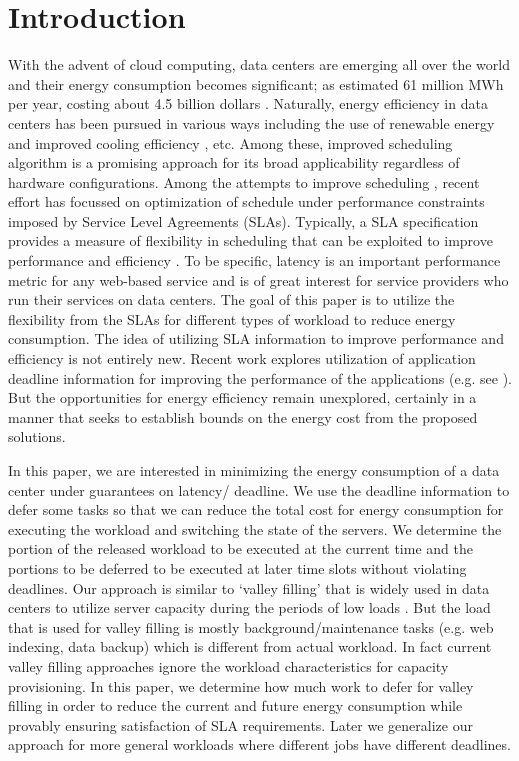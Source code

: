 \documentclass[10pt,conference,compsocconf,letterpaper]{IEEEtran}
\begin{document}
\section{Introduction}
With the advent of cloud computing, data centers are emerging all over the world and their energy consumption becomes significant; as estimated 61 million MWh per year, costing about 4.5 billion dollars \cite{23}. Naturally, energy efficiency in data centers has been pursued in various ways including the use of renewable energy \cite{22,25} and improved cooling efficiency \cite{26,30,17}, etc. Among these, improved scheduling algorithm is a promising approach for its broad applicability regardless of hardware configurations. Among the attempts to improve scheduling \cite{17, 9}, recent effort has focussed on optimization of schedule under performance constraints imposed by Service Level Agreements (SLAs). Typically, a SLA specification provides a measure of flexibility in scheduling that can be exploited to improve performance and efficiency \cite{n9,n10}. To be specific, latency is an important performance metric for any web-based service and is of great interest for service providers who run their services on data centers.
The goal of this paper is to utilize the flexibility from the SLAs for different types of workload to reduce energy consumption. The idea of utilizing SLA information to improve performance and efficiency is not entirely new. Recent work explores utilization of application deadline information for improving the performance of the applications (e.g. see \cite{n10, n6}). But the opportunities for energy efficiency remain unexplored, certainly in a manner that seeks to establish bounds on the energy cost from the proposed solutions.




In this paper, we are interested in minimizing the energy consumption of a data center under guarantees on latency/ deadline. We use the deadline information to defer some tasks so that we can reduce the total cost for energy consumption for executing the workload and switching the state of the servers. We determine the portion of the released workload to be executed at the current time and the portions to be deferred to be executed at later time slots without violating deadlines. Our approach is similar to `valley filling' that is widely used in data centers to utilize server capacity during the periods of low loads \cite{9}. But the load that is used for valley filling is mostly background/maintenance tasks (e.g. web indexing, data backup) which is different from actual workload. In fact current valley filling approaches ignore the workload characteristics for capacity provisioning. In this paper, we determine how much work to defer for valley filling in order to reduce the current and future energy consumption while provably ensuring satisfaction of SLA requirements. Later we generalize our approach for more general workloads where different jobs have different deadlines.
\end{document}
